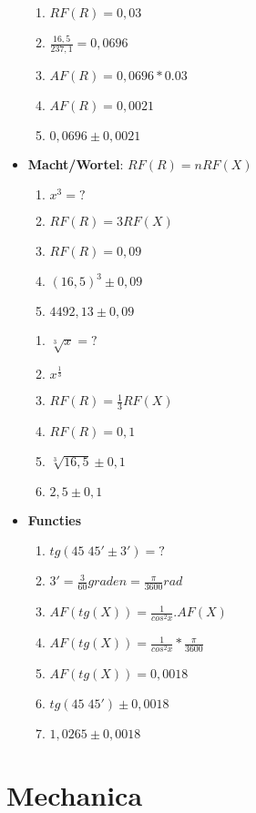 \documentclass[12pt]{report}
\newcommand{\important}[1] {\textbf{\color{orange}#1}}
\begin{document}
\begin{itemize}
\begin{enumerate}
   \item $RF(R) = 0,03$
   \item $\frac{16,5}{237,1} = 0,0696$
   \item $AF(R) = 0,0696 * 0.03$
   \item $AF(R) = 0,0021$
   \item \important{$0,0696 \pm 0,0021$}
  \end{enumerate}
  \item {\important{Macht/Wortel}: $RF(R) = nRF(X)$}
  \begin{enumerate}
   \item $x^3 = ?$
   \item $RF(R) = 3RF(X)$
   \item $RF(R) = 0,09$
   \item $(16,5)^3 \pm 0,09$
   \item \important{$4492,13 \pm 0,09$}
  \end{enumerate}
  \begin{enumerate}
   \item $\sqrt[3]{x} = ?$ 
   \item $x^{\frac{1}{3}}$
   \item $RF(R) = \frac{1}{3}RF(X)$
   \item $RF(R)  = 0,1$
   \item $\sqrt[3]{16,5} \pm 0,1$
   \item \important{$2,5 \pm 0,1$}
  \end{enumerate}
  
  \item{\important{Functies}}
  \begin{enumerate}
   \item $tg(45\;45' \pm 3') = ?$
   \item $3' = \frac{3}{60} graden = \frac{\pi}{3600}rad$
   \item $AF(tg(X)) = \frac{1}{cos^2x}.AF(X)$
   \item $AF(tg(X)) = \frac{1}{cos^2x}*\frac{\pi}{3600}$
   \item $AF(tg(X)) = 0,0018$
   \item $tg(45\;45') \pm 0,0018$
   \item \important{$1,0265 \pm 0,0018$}
  \end{enumerate}



\end{itemize}




\part{Mechanica}
\end{document}
